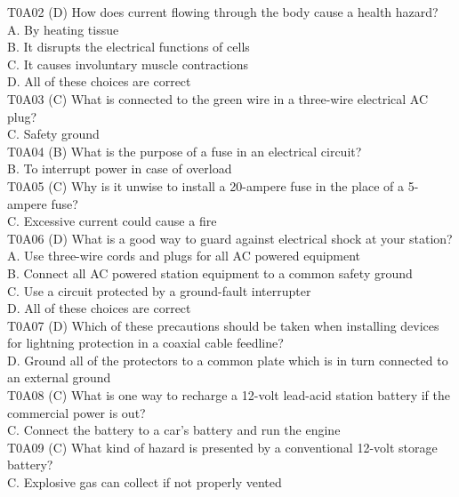 \documentclass[12pt,letterpaper]{report}
\begin{document}
T0A02 (D) How does current flowing through the body cause a health hazard?\\
A. By heating tissue\\
B. It disrupts the electrical functions of cells\\
C. It causes involuntary muscle contractions\\
D. All of these choices are correct\\

T0A03 (C) What is connected to the green wire in a three-wire electrical AC plug?\\
C. Safety ground\\

T0A04 (B) What is the purpose of a fuse in an electrical circuit?\\
B. To interrupt power in case of overload\\

T0A05 (C) Why is it unwise to install a 20-ampere fuse in the place of a 5-ampere fuse?\\
C. Excessive current could cause a fire\\

T0A06 (D) What is a good way to guard against electrical shock at your station?\\
A. Use three-wire cords and plugs for all AC powered equipment\\
B. Connect all AC powered station equipment to a common safety ground\\
C. Use a circuit protected by a ground-fault interrupter\\
D. All of these choices are correct\\

T0A07 (D) Which of these precautions should be taken when installing devices for lightning protection in a coaxial cable feedline?\\
D. Ground all of the protectors to a common plate which is in turn connected to an external ground\\

T0A08 (C) What is one way to recharge a 12-volt lead-acid station battery if the commercial power is out?\\
C. Connect the battery to a car's battery and run the engine\\

T0A09 (C) What kind of hazard is presented by a conventional 12-volt storage battery?\\
C. Explosive gas can collect if not properly vented\\
\end{document}
